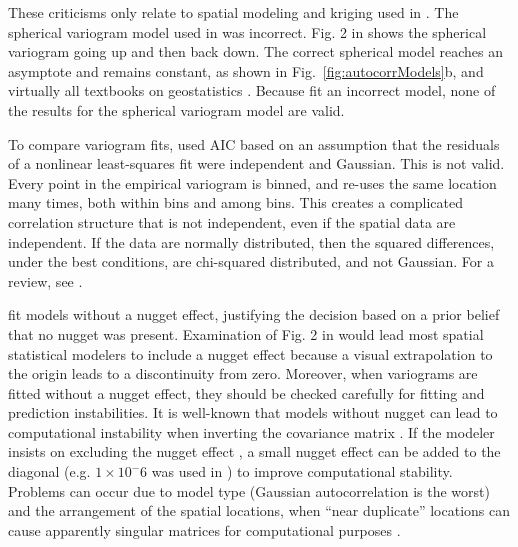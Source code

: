 \documentclass[11pt, titlepage]{article}\usepackage[]{graphicx}\usepackage[]{color}
\begin{document}
\begin{spacing}{1.9}
\begin{flushleft}
These criticisms only relate to spatial modeling and kriging used in \citet{Ladl:Avga:Whea:Boyc:pred:2016}. The spherical variogram model used in \citet{Ladl:Avga:Whea:Boyc:pred:2016} was incorrect.  Fig. 2 in \citet{Ladl:Avga:Whea:Boyc:pred:2016} shows the spherical variogram going up and then back down.  The correct spherical model reaches an asymptote and remains constant, as shown in Fig.~\ref{fig:autocorrModels}b, and virtually all textbooks on geostatistics \citep{Jour:Huij:mini:1978,Isaa:Sriv:appl:1989,Cres:stat:1993,Goov:geos:1997,Chil:Delf:geos:1999,Fort:Dale:spat:2005,Webs:Oliv:geos:2007}. Because \citet{Ladl:Avga:Whea:Boyc:pred:2016} fit an incorrect model, none of the results for the spherical variogram model are valid.
		
To compare variogram fits, \citet{Ladl:Avga:Whea:Boyc:pred:2016} used AIC based on an assumption that the residuals of a nonlinear least-squares fit were independent and Gaussian. This is not valid.  Every point in the empirical variogram is binned, and re-uses the same location many times, both within bins and among bins.  This creates a complicated correlation structure that is not independent, even if the spatial data are independent.  If the data are normally distributed, then the squared differences, under the best conditions, are chi-squared distributed, and not Gaussian.  For a review, see \citet{Cres:stat:1993}.

\citet{Ladl:Avga:Whea:Boyc:pred:2016} fit models without a nugget effect, justifying the decision based on a prior belief that no nugget was present. Examination of Fig. 2 in \citet{Ladl:Avga:Whea:Boyc:pred:2016} would lead most spatial statistical modelers to include a nugget effect because a visual extrapolation to the origin leads to a discontinuity from zero.  Moreover, when variograms are fitted without a nugget effect, they should be checked carefully for fitting and prediction instabilities. It is well-known that models without nugget can lead to computational instability when inverting the covariance matrix \citep{Diam:Arms:robu:1984,Posa:cond:1989,ODow:cond:1991,Abab:cond:1994}. If the modeler insists on excluding the nugget effect \citep[as often occurs when using kriging to approximate deterministic computer models, e.g.][]{Mart:Simp:krig:2005}, a small nugget effect can be added to the diagonal (e.g. $1 \times 10^-6$ was used in \citet{Book:Denn:Fran:Sera:etal:rigo:1999}) to improve computational stability.  Problems can occur due to model type (Gaussian autocorrelation is the worst) and the arrangement of the spatial locations, when ``near duplicate'' locations can cause apparently singular matrices for computational purposes \citep[][p. 220]{Biva:Pebe:Gome:appl:2008}.


\end{flushleft}
\end{spacing}
\end{document}
